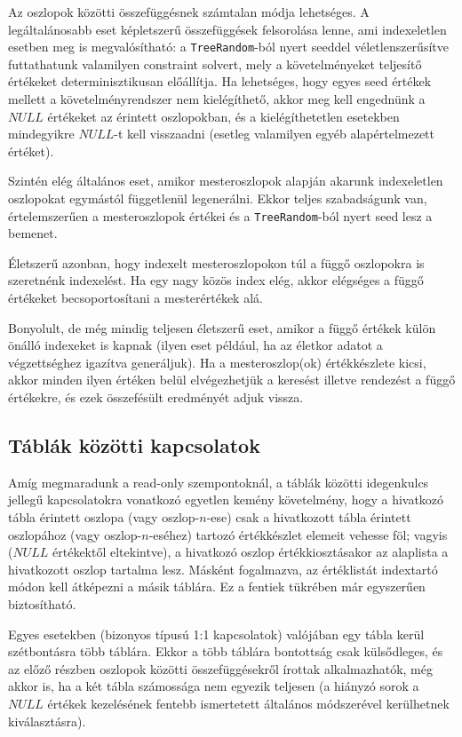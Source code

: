 \documentclass[
    parspace,
    noindent,
    nohyp,
]{elteiktdk}[2023/04/10]
\begin{document}
Az oszlopok közötti összefüggésnek számtalan módja lehetséges.
A legáltalánosabb eset képletszerű összefüggések felsorolása lenne,
ami indexeletlen esetben meg is megvalósítható:
a \texttt{TreeRandom}-ból nyert seeddel véletlenszerűsítve futtathatunk valamilyen constraint solvert,
mely a követelményeket teljesítő értékeket determinisztikusan előállítja.
Ha lehetséges, hogy egyes seed értékek mellett a követelményrendszer nem kielégíthető,
akkor meg kell engednünk a $NULL$ értékeket az érintett oszlopokban,
és a kielégíthetetlen esetekben mindegyikre $NULL$-t kell visszaadni
(esetleg valamilyen egyéb alapértelmezett értéket).

Szintén elég általános eset, amikor mesteroszlopok
alapján akarunk indexeletlen oszlopokat egymástól függetlenül legenerálni.
Ekkor teljes szabadságunk van,
értelemszerűen a mesteroszlopok értékei és a \texttt{TreeRandom}-ból nyert seed lesz a bemenet.

Életszerű azonban, hogy indexelt mesteroszlopokon túl
a függő oszlopokra is szeretnénk indexelést.
Ha egy nagy közös index elég,
akkor elégséges a függő értékeket becsoportosítani a mesterértékek alá.

Bonyolult, de még mindig teljesen életszerű eset,
amikor a függő értékek külön önálló indexeket is kapnak
(ilyen eset például, ha az életkor adatot a végzettséghez igazítva generáljuk).
Ha a mesteroszlop(ok) értékkészlete kicsi,
akkor minden ilyen értéken belül elvégezhetjük a keresést illetve rendezést a függő értékekre,
és ezek összefésült eredményét adjuk vissza.

\subsection{Táblák közötti kapcsolatok}

Amíg megmaradunk a read-only szempontoknál,
a táblák közötti idegenkulcs jellegű kapcsolatokra vonatkozó egyetlen kemény követelmény,
hogy a hivatkozó tábla érintett oszlopa (vagy oszlop-$n$-ese)
csak a hivatkozott tábla érintett oszlopához (vagy oszlop-$n$-eséhez)
tartozó értékkészlet elemeit vehesse föl;
vagyis ($NULL$ értékektől eltekintve),
a hivatkozó oszlop értékkiosztásakor az alaplista a hivatkozott oszlop tartalma lesz.
Másként fogalmazva, az értéklistát indextartó módon kell átképezni a másik táblára.
Ez a fentiek tükrében már egyszerűen biztosítható.

Egyes esetekben (bizonyos típusú 1:1 kapcsolatok) valójában egy tábla kerül szétbontásra több táblára.
Ekkor a több táblára bontottság csak külsődleges,
és az előző részben oszlopok közötti összefüggésekről írottak alkalmazhatók,
még akkor is, ha a két tábla számossága nem egyezik teljesen
(a hiányzó sorok a $NULL$ értékek kezelésének fentebb ismertetett
általános módszerével kerülhetnek kiválasztásra).
\end{document}
